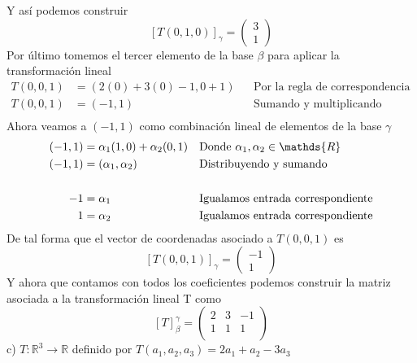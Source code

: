 \documentclass[letterpaper]{article}
\newcommand{\R}{\mathds{R}}
\renewcommand{\*}{\cdot}
\theoremstyle{definition}
\begin{document}
		Y así podemos construir 
		\[ [T(0,1,0)]_{\gamma} = \begin{pmatrix}
		3\\
		1
		\end{pmatrix} \]	
		Por último tomemos el tercer elemento de la base $ \beta $ para aplicar la transformación lineal
		\begin{align*}
			T(0,0,1) & = (2(0) + 3(0) -1, 0+1) && \text{Por la regla de correspondencia de T}\\
			T(0,0,1) & = (-1, 1) && \text{Sumando y multiplicando respectivamente}\\
		\end{align*}
		Ahora veamos a $ (-1,1) $ como combinación lineal de elementos de la base $ \gamma $
		\begin{align*}
			(-1,1) &= \alpha_1(1,0) + \alpha_2(0,1) && \text{Donde $ \alpha_1, \alpha_2 \in \R$}\\
			(-1,1) &= (\alpha_1,\alpha_2) && \text{Distribuyendo y sumando}\\
			\\
			-1 &= \alpha_1 && \text{Igualamos entrada correspondiente}\\
			1 &= \alpha_2 && \text{Igualamos entrada correspondiente}\\
		\end{align*}
		De tal forma que el vector de coordenadas asociado a $ T(0,0,1) $ es 
		\[ [T(0,0,1)]_{\gamma} = \begin{pmatrix}
		-1\\
		1
		\end{pmatrix} \]
		Y ahora que contamos con todos los coeficientes podemos construir la matriz asociada a la transformación lineal T como
		\[ [T]_{\beta}^{\gamma} = \begin{pmatrix}
		2 & 3 & -1\\
		1 & 1 & 1\\
		\end{pmatrix} \]
		c) $T: \mathbb{R}^{3} \longrightarrow \mathbb{R}$ definido por $T(a_{1},a_{2},a_{3}) = 2a_{1} + a_{2} - 3a_{3}$
		
\end{document}
